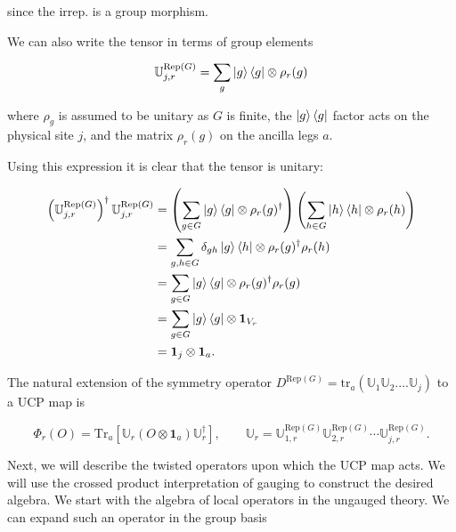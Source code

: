 \documentclass{article}
\theoremstyle{definition}
\begin{document}
since the irrep. is a group morphism. 

We can also write the tensor in terms of group elements 

\begin{equation}
    \mathbb{U}^{\text{Rep}(G)}_{j,r} = \sum_g \ket{g} \bra{g} \otimes \rho_r(g) 
\end{equation}

where $\rho_g$ is assumed to be unitary as $G$ is finite, the $\ket{g}\bra{g}$ factor acts on the physical site $j$, and the matrix $\rho_r(g)$ on the ancilla legs $a$.  

Using this expression it is clear that the tensor is unitary:

\begin{equation}
\begin{aligned}
\left(\mathbb{U}^{\text{Rep}(G)}_{j,r}\right)^\dagger
\mathbb{U}^{\text{Rep}(G)}_{j,r}
&=
\left(\sum_{g\in G} \ket{g}\bra{g}\otimes \rho_r(g)^\dagger\right)
\left(\sum_{h\in G} \ket{h}\bra{h}\otimes \rho_r(h)\right) \\
&=
\sum_{g,h\in G}
\delta_{gh}\ket{g}\bra{h}
\otimes
\rho_r(g)^\dagger \rho_r(h) \\
&=
\sum_{g\in G}
\ket{g}\bra{g}
\otimes
\rho_r(g)^\dagger \rho_r(g) \\
&=
\sum_{g\in G}
\ket{g}\bra{g}
\otimes \mathbf{1}_{V_r} \\
&=
\mathbf{1}_{j}\otimes \mathbf{1}_{a}.
\end{aligned}
\end{equation}

The natural extension of the symmetry operator $D^{\text{Rep}(G)} = \text{tr}_a(\mathbb{U}_1\mathbb{U}_2....\mathbb{U}_j)$ to a UCP map is 

\begin{equation}
    \Phi_r(O) = 
    \text{Tr}_{a}
    \left[
        \mathbb{U}_r
        (O\otimes \mathbf{1}_{a})
       \mathbb{U}_r^\dagger
    \right],
    \qquad
    \mathbb{U}_r
    =
    \mathbb{U}^{\text{Rep}(G)}_{1,r}
    \mathbb{U}^{\text{Rep}(G)}_{2,r}
    \cdots
    \mathbb{U}^{\text{Rep}(G)}_{j,r}.
\end{equation}



Next, we will describe the twisted operators upon which the UCP map acts. We will use the crossed product interpretation of gauging to construct the desired algebra.  We start with the algebra of local operators in the ungauged theory.  We can expand such an operator in the group basis
\end{document}
